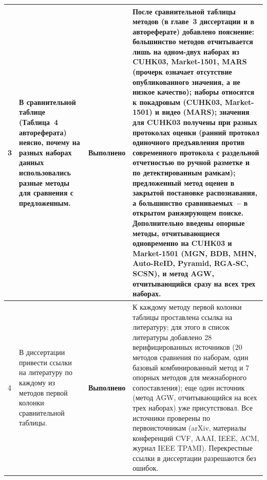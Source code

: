 \documentclass[a4paper,11pt]{article}
\newcommand{\statusDone}{{\color{statusDone}\textbf{Выполнено}}}
\begin{document}
\begin{longtable}{@{}p{}p{}p{}p{}@{}}
3 & В сравнительной таблице (Таблица~4 автореферата) неясно, почему на разных наборах данных использовались разные методы для сравнения с предложенным.
& \statusDone
& После сравнительной таблицы методов (в главе~3 диссертации и в автореферате) добавлено пояснение: большинство методов отчитывается лишь на одном-двух наборах из CUHK03, Market-1501, MARS (прочерк означает отсутствие опубликованного значения, а не низкое качество); наборы относятся к покадровым (CUHK03, Market-1501) и видео (MARS); значения для CUHK03 получены при разных протоколах оценки (ранний протокол одиночного предъявления против современного протокола с раздельной отчетностью по ручной разметке и по детектированным рамкам); предложенный метод оценен в закрытой постановке распознавания, а большинство сравниваемых~-- в открытом ранжирующем поиске. Дополнительно введены опорные методы, отчитывающиеся одновременно на CUHK03 и Market-1501 (MGN, BDB, MHN, Auto-ReID, Pyramid, RGA-SC, SCSN), и метод AGW, отчитывающийся сразу на всех трех наборах.\\
\midrule

4 & В диссертации привести ссылки на литературу по каждому из методов первой колонки сравнительной таблицы.
& \statusDone
& К каждому методу первой колонки таблицы проставлена ссылка на литературу; для этого в список литературы добавлено 28 верифицированных источников (20 методов сравнения по наборам, один базовый комбинированный метод и 7 опорных методов для межнаборного сопоставления); еще один источник (метод AGW, отчитывающийся на всех трех наборах) уже присутствовал. Все источники проверены по первоисточникам (arXiv, материалы конференций CVF, AAAI, IEEE, ACM, журнал IEEE TPAMI). Перекрестные ссылки в диссертации разрешаются без ошибок.\\
\end{longtable}
\end{document}

